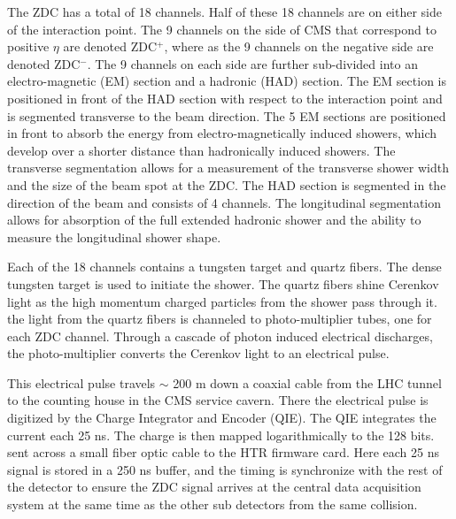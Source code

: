     The ZDC has a total of 18 channels.
        Half of these 18 channels are on either side of the interaction point.
    The 9 channels on the side of CMS that correspond to positive $\eta$
      are denoted ZDC$^{+}$, where as the 9 channels on the negative side are
      denoted ZDC$^{-}$.
    The 9 channels on each side are further sub-divided into an electro-magnetic  
      (EM) section and a hadronic (HAD) section.
    The EM section is positioned in front of the HAD section with respect to the 
      interaction point and is segmented transverse to the beam direction.
    The 5 EM sections are positioned in front to absorb the energy from 
      electro-magnetically induced showers, which develop over a shorter distance 
      than hadronically induced showers.
    The transverse segmentation allows for a measurement of the transverse shower
      width and the size of the beam spot at the ZDC.
    The HAD section is segmented in the direction of the beam and consists of 4
      channels.
    The longitudinal segmentation allows for absorption of the full extended 
      hadronic shower and the ability to measure the longitudinal shower shape.

    Each of the 18 channels contains a tungsten target and quartz fibers.
    The dense tungsten target is used to initiate the shower.
    The quartz fibers shine Cerenkov light as the high momentum charged particles
      from the shower pass through it. 
    the light from the quartz fibers is channeled to photo-multiplier tubes, one 
      for each ZDC channel. 
    Through a cascade of photon induced electrical discharges, the photo-multiplier
      converts the Cerenkov light to an electrical pulse. 

    This electrical pulse travels $\sim$ 200 m down a coaxial cable from the LHC
      tunnel to the counting house in the CMS service cavern. 
    There the electrical pulse is digitized by the Charge Integrator and Encoder 
      (QIE).
    The QIE integrates the current each 25 ns.
    The charge is then mapped logarithmically to the 128 bits. 
    \DIFdelbegin {}\DIFdelend \DIFaddbegin {}\DIFaddend sent across a small fiber optic cable to the HTR firmware card.
    Here each 25 ns signal is stored in a 250 ns buffer, and the timing is synchronize
      with the rest of the detector to ensure the ZDC signal arrives at the central
      data acquisition system at the same time as the other sub detectors from the 
      same collision. 

